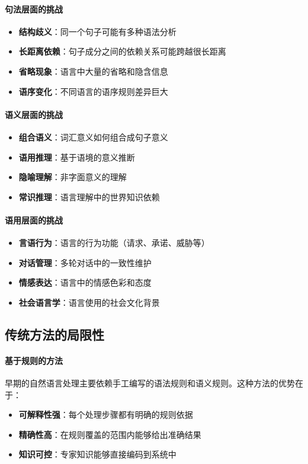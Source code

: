 \paragraph{句法层面的挑战}
\begin{itemize}
\item \textbf{结构歧义}：同一个句子可能有多种语法分析
\item \textbf{长距离依赖}：句子成分之间的依赖关系可能跨越很长距离
\item \textbf{省略现象}：语言中大量的省略和隐含信息
\item \textbf{语序变化}：不同语言的语序规则差异巨大
\end{itemize}

\paragraph{语义层面的挑战}
\begin{itemize}
\item \textbf{组合语义}：词汇意义如何组合成句子意义
\item \textbf{语用推理}：基于语境的意义推断
\item \textbf{隐喻理解}：非字面意义的理解
\item \textbf{常识推理}：语言理解中的世界知识依赖
\end{itemize}

\paragraph{语用层面的挑战}
\begin{itemize}
\item \textbf{言语行为}：语言的行为功能（请求、承诺、威胁等）
\item \textbf{对话管理}：多轮对话中的一致性维护
\item \textbf{情感表达}：语言中的情感色彩和态度
\item \textbf{社会语言学}：语言使用的社会文化背景
\end{itemize}

\subsection{传统方法的局限性}

\paragraph{基于规则的方法}
早期的自然语言处理主要依赖手工编写的语法规则和语义规则。这种方法的优势在于：
\begin{itemize}
\item \textbf{可解释性强}：每个处理步骤都有明确的规则依据
\item \textbf{精确性高}：在规则覆盖的范围内能够给出准确结果
\item \textbf{知识可控}：专家知识能够直接编码到系统中
\end{itemize}

